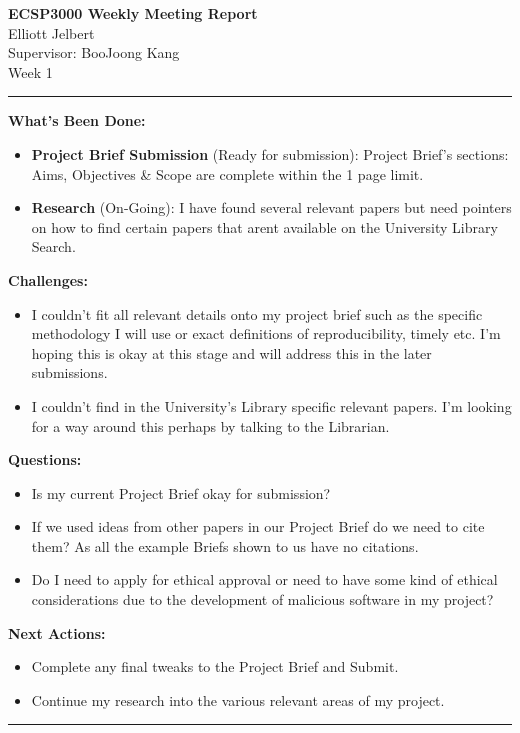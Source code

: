 \documentclass[5pt]{article}
\begin{document}
\begin{center}
    {\Large \textbf{ECSP3000 Weekly Meeting Report}} \\[1em] 
    Elliott Jelbert \\ 
    Supervisor: BooJoong Kang \\[0.5em]
    
    Week 1
    
    \vspace{1em} 
    
    \rule{\textwidth}{1pt}
\end{center}

\vspace{1.5em} 


\noindent \textbf{\large What's Been Done:}
\begin{itemize}[label=$\bullet$]
    \item \textbf{Project Brief Submission} (Ready for submission): Project Brief's sections: Aims, Objectives \& Scope are complete within the 1 page limit.
    \item \textbf{Research} (On-Going): I have found several relevant papers but need pointers on how to find certain papers that arent available on the University Library Search.
\end{itemize}

\vspace{2em} 

\noindent \textbf{\large Challenges:}
\begin{itemize}[label=$\bullet$]
    \item I couldn't fit all relevant details onto my project brief such as the specific methodology I will use or exact definitions of reproducibility, timely etc. I'm hoping this is okay at this stage and will address this in the later submissions.
    \item I couldn't find in the University's Library specific relevant papers. I'm looking for a way around this perhaps by talking to the Librarian.
\end{itemize}

\vspace{2em} 

\noindent \textbf{\large Questions:}
\begin{itemize}[label=$\bullet$]
    \item Is my current Project Brief okay for submission?
    \item If we used ideas from other papers in our Project Brief do we need to cite them? As all the example Briefs shown to us have no citations.
    \item Do I need to apply for ethical approval or need to have some kind of ethical considerations due to the development of malicious software in my project?
\end{itemize}

\vspace{2em} 

\noindent \textbf{\large Next Actions:}
\begin{itemize}[label=$\bullet$]
    \item Complete any final tweaks to the Project Brief and Submit.
    \item Continue my research into the various relevant areas of my project.
\end{itemize}

\vspace{3em} 
\rule{\textwidth}{1pt}
\end{document}
